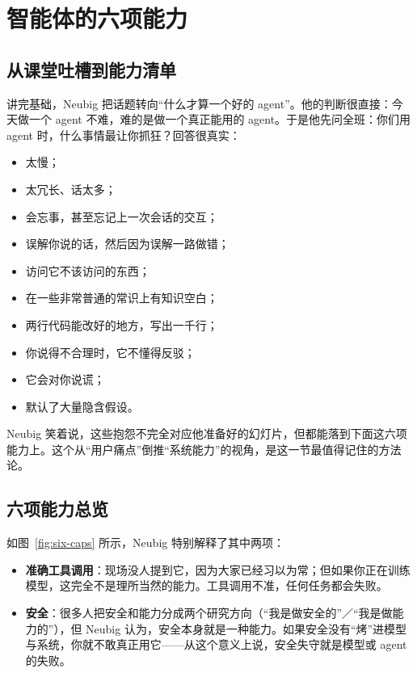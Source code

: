 \documentclass[a4paper]{article}
\begin{document}
\section{智能体的六项能力}

\subsection{从课堂吐槽到能力清单}

讲完基础，Neubig 把话题转向“什么才算一个好的 agent”。他的判断很直接：今天做一个 agent 不难，难的是做一个真正能用的 agent。于是他先问全班：你们用 agent 时，什么事情最让你抓狂？回答很真实：

\begin{itemize}
\item 太慢；
\item 太冗长、话太多；
\item 会忘事，甚至忘记上一次会话的交互；
\item 误解你说的话，然后因为误解一路做错；
\item 访问它不该访问的东西；
\item 在一些非常普通的常识上有知识空白；
\item 两行代码能改好的地方，写出一千行；
\item 你说得不合理时，它不懂得反驳；
\item 它会对你说谎；
\item 默认了大量隐含假设。
\end{itemize}

Neubig 笑着说，这些抱怨不完全对应他准备好的幻灯片，但都能落到下面这六项能力上。这个从“用户痛点”倒推“系统能力”的视角，是这一节最值得记住的方法论。

\subsection{六项能力总览}

如图~\ref{fig:six-caps} 所示，Neubig 特别解释了其中两项：

\begin{itemize}
\item \textbf{准确工具调用}：现场没人提到它，因为大家已经习以为常；但如果你正在训练模型，这完全不是理所当然的能力。工具调用不准，任何任务都会失败。
\item \textbf{安全}：很多人把安全和能力分成两个研究方向（“我是做安全的”／“我是做能力的”），但 Neubig 认为，安全本身就是一种能力。如果安全没有“烤”进模型与系统，你就不敢真正用它——从这个意义上说，安全失守就是模型或 agent 的失败。
\end{itemize}
\end{document}
